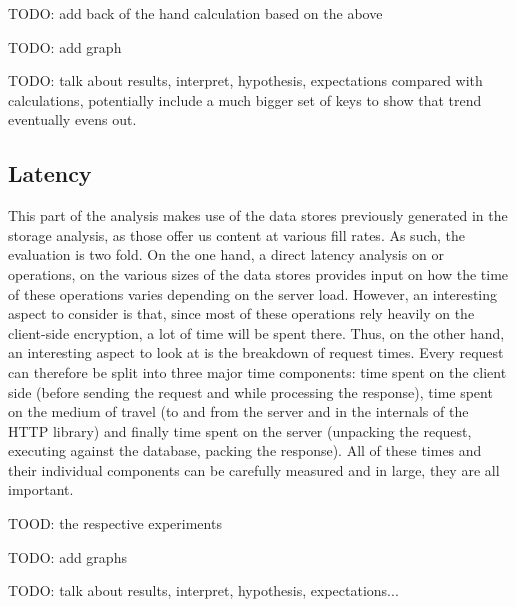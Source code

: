 TODO: add back of the hand calculation based on the above

TODO: add graph

TODO: talk about results, interpret, hypothesis, expectations compared with calculations, potentially include a much bigger set of keys to show that trend eventually evens out.

\subsection{Latency}
This part of the analysis makes use of the data stores previously generated in the storage analysis, as those offer us content at various fill rates.
As such, the evaluation is two fold.
On the one hand, a direct latency analysis on  or  operations, on the various sizes of the data stores provides input on how the time of these operations varies depending on the server load.
However, an interesting aspect to consider is that, since most of these operations rely heavily on the client-side encryption, a lot of time will be spent there.
Thus, on the other hand, an interesting aspect to look at is the breakdown of request times.
Every request can therefore be split into three major time components: time spent on the client side (before sending the request and while processing the response), time spent on the medium of travel (to and from the server and in the internals of the HTTP library) and finally time spent on the server (unpacking the request, executing against the database, packing the response).
All of these times and their individual components can be carefully measured and in large, they are all important.

TOOD: the respective experiments

TODO: add graphs

TODO: talk about results, interpret, hypothesis, expectations...
